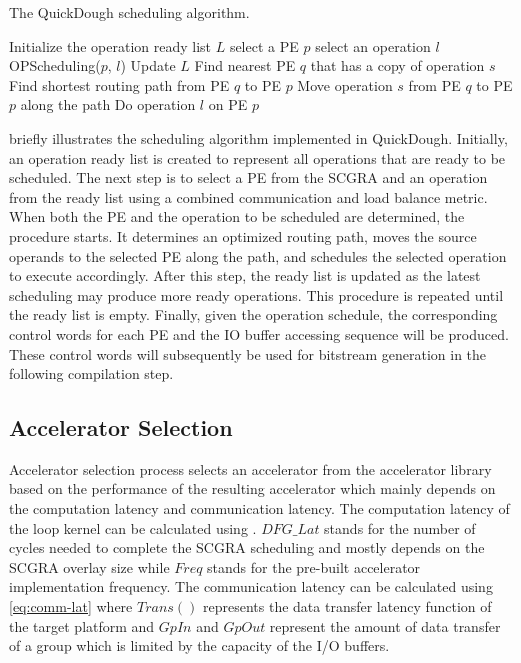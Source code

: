  \begin{algorithm}
 \small
 \caption{The QuickDough scheduling algorithm.}
 \label{alg:scheduling}
 \begin{algorithmic}
 \STATE Initialize the operation ready list $L$
 \STATE select a PE $p$
 \STATE select an operation $l$
 \STATE OPScheduling($p$, $l$)
 \STATE Update $L$
 \ENDWHILE
 \ENDPROCEDURE
 \STATE
 \STATE Find nearest PE $q$ that has a copy of operation $s$
 \STATE Find shortest routing path from PE $q$ to PE $p$
 \STATE Move operation $s$ from PE $q$ to PE $p$ along the path
 \ENDFOR
 \STATE Do operation $l$ on PE $p$
 \ENDPROCEDURE

 \end{algorithmic}
 \end{algorithm}

 briefly illustrates the scheduling algorithm implemented in QuickDough. Initially, an operation ready list is created to represent all operations that are ready to be scheduled. The next step is to select a PE from the SCGRA and an operation from the ready list using a combined communication and load balance metric. When both the PE and the operation to be scheduled are determined, the  procedure starts. It determines an optimized routing path, moves the source operands to the selected PE along the path, and schedules the selected operation to execute accordingly. After this step, the ready list is updated as the latest scheduling may produce more ready operations. This  procedure is repeated until the ready list is empty. Finally, given the operation schedule, the corresponding control words for each PE and the IO buffer accessing sequence will be produced. These control words will subsequently be used for bitstream generation in the following compilation step.

\subsection{Accelerator Selection} \label{sec:accel-sel}
Accelerator selection process selects an accelerator from the accelerator library based on the performance of the resulting accelerator which mainly depends on the computation latency and communication latency. The computation latency of the loop kernel can be calculated using . $DFG\_Lat$ stands for the number of cycles needed to complete the SCGRA scheduling and mostly depends on the SCGRA overlay size while $Freq$ stands for the pre-built accelerator implementation frequency. The communication latency can be calculated using \eqref{eq:comm-lat} where $Trans()$ represents the data transfer latency function of the target platform and $GpIn$ and $GpOut$ represent the amount of data transfer of a group which is limited by the capacity of the I/O buffers. 

